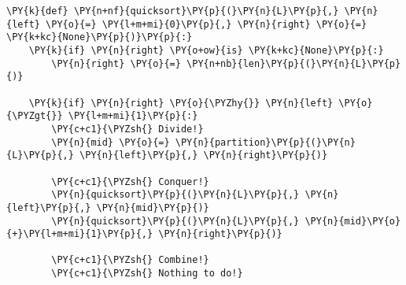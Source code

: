 \begin{Verbatim}[commandchars=\\\{\}]
\PY{k}{def} \PY{n+nf}{quicksort}\PY{p}{(}\PY{n}{L}\PY{p}{,} \PY{n}{left} \PY{o}{=} \PY{l+m+mi}{0}\PY{p}{,} \PY{n}{right} \PY{o}{=} \PY{k+kc}{None}\PY{p}{)}\PY{p}{:}
    \PY{k}{if} \PY{n}{right} \PY{o+ow}{is} \PY{k+kc}{None}\PY{p}{:}
        \PY{n}{right} \PY{o}{=} \PY{n+nb}{len}\PY{p}{(}\PY{n}{L}\PY{p}{)}

    \PY{k}{if} \PY{n}{right} \PY{o}{\PYZhy{}} \PY{n}{left} \PY{o}{\PYZgt{}} \PY{l+m+mi}{1}\PY{p}{:}    
        \PY{c+c1}{\PYZsh{} Divide!}
        \PY{n}{mid} \PY{o}{=} \PY{n}{partition}\PY{p}{(}\PY{n}{L}\PY{p}{,} \PY{n}{left}\PY{p}{,} \PY{n}{right}\PY{p}{)}

        \PY{c+c1}{\PYZsh{} Conquer!}
        \PY{n}{quicksort}\PY{p}{(}\PY{n}{L}\PY{p}{,} \PY{n}{left}\PY{p}{,} \PY{n}{mid}\PY{p}{)}
        \PY{n}{quicksort}\PY{p}{(}\PY{n}{L}\PY{p}{,} \PY{n}{mid}\PY{o}{+}\PY{l+m+mi}{1}\PY{p}{,} \PY{n}{right}\PY{p}{)}

        \PY{c+c1}{\PYZsh{} Combine!}
        \PY{c+c1}{\PYZsh{} Nothing to do!}
\end{Verbatim}


